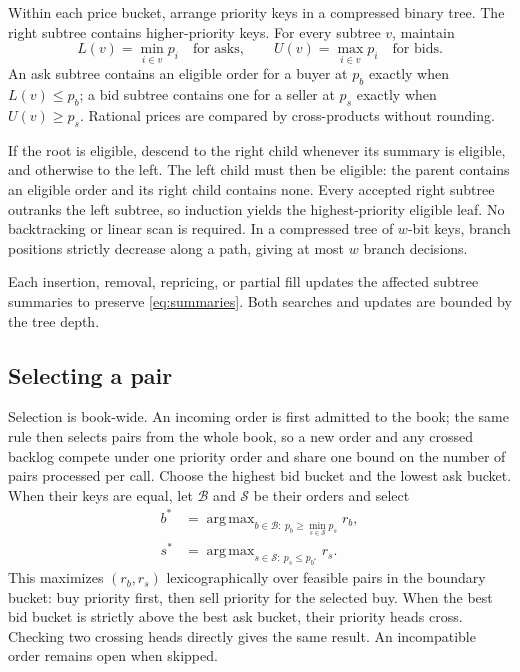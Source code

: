 Within each price bucket, arrange priority keys in a compressed binary tree. The right
subtree contains higher-priority keys. For every subtree $v$, maintain
\begin{equation}
 L(v)=\min_{i\in v}p_i\quad\text{for asks},\qquad
 U(v)=\max_{i\in v}p_i\quad\text{for bids}.
 \label{eq:summaries}
\end{equation}
An ask subtree contains an eligible order for a buyer at $p_b$ exactly when $L(v)\le p_b$;
a bid subtree contains one for a seller at $p_s$ exactly when $U(v)\ge p_s$.
Rational prices are compared by cross-products without rounding.

If the root is eligible, descend to the right child whenever its summary is eligible,
and otherwise to the left. The left child must then be eligible: the parent contains an
eligible order and its right child contains none. Every accepted right subtree outranks
the left subtree, so induction yields the highest-priority eligible leaf. No backtracking
or linear scan is required. In a compressed tree of $w$-bit keys, branch positions strictly
decrease along a path, giving at most $w$ branch decisions.

Each insertion, removal, repricing, or partial fill updates the affected subtree summaries
to preserve \eqref{eq:summaries}. Both searches and updates are bounded by the tree depth.

\subsection{Selecting a pair}

Selection is book-wide. An incoming order is first admitted to the book; the same rule then
selects pairs from the whole book, so a new order and any crossed backlog compete under one
priority order and share one bound on the number of pairs processed per call. Choose the highest bid bucket and
the lowest ask bucket. When their
keys are equal, let $\mathcal B$ and $\mathcal S$ be their orders and select
\begin{align}
 b^*&=\mathop{\mathrm{arg\,max}}_{b\in\mathcal B:\ p_b\ge\min_{s\in\mathcal S}p_s}r_b,\\
 s^*&=\mathop{\mathrm{arg\,max}}_{s\in\mathcal S:\ p_s\le p_{b^*}}r_s.
\end{align}
This maximizes $(r_b,r_s)$ lexicographically over feasible pairs in the boundary bucket:
buy priority first, then sell priority for the selected buy. When the best bid bucket is
strictly above the best ask bucket, their priority heads cross. Checking two crossing
heads directly gives the same result. An incompatible order remains open when skipped.

